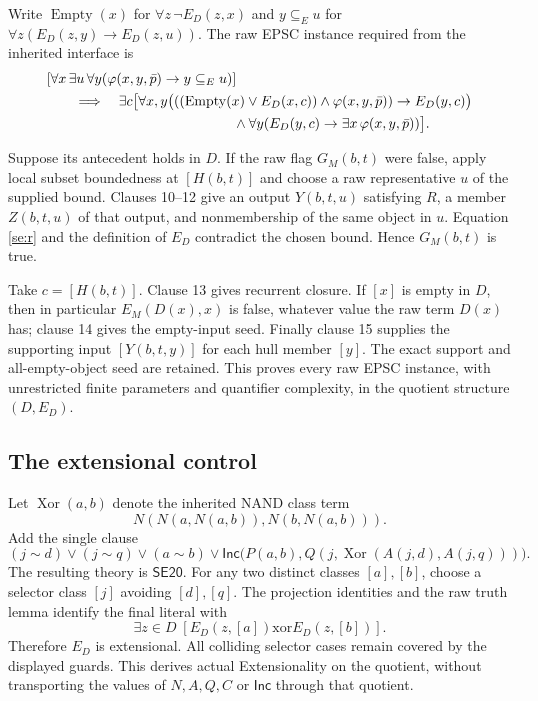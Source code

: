 Write $\operatorname{Empty}(x)$ for $\forall z\,\neg E_D(z,x)$
and $y\subseteq_E u$ for $\forall z(E_D(z,y)\to E_D(z,u))$.
The raw EPSC instance required from the inherited interface is
\begin{align*}
 &[\forall x\,\exists u\,\forall y
       (\varphi(x,y,\bar p)\to y\subseteq_E u)]\\
 &\qquad\Longrightarrow\quad
 \exists c\bigl[
 \forall x,y\bigl(((\operatorname{Empty}(x)\lor E_D(x,c))
     \land\varphi(x,y,\bar p))\to E_D(y,c)\bigr)\\
 &\hspace{47mm}\land\forall y(E_D(y,c)\to\exists x\,
                  \varphi(x,y,\bar p))\bigr].
\end{align*}

Suppose its antecedent holds in $D$. If the raw flag $G_M(b,t)$ were
false, apply local subset boundedness at $[H(b,t)]$ and choose a raw
representative $u$ of the supplied bound. Clauses 10--12 give an output
$Y(b,t,u)$ satisfying $R$, a member $Z(b,t,u)$ of that output, and
nonmembership of the same object in $u$. Equation \eqref{se:r} and
the definition of $E_D$ contradict the chosen bound. Hence $G_M(b,t)$
is true.

Take $c=[H(b,t)]$. Clause 13 gives recurrent closure. If $[x]$ is
empty in $D$, then in particular $E_M(D(x),x)$ is false, whatever value
the raw term $D(x)$ has; clause 14 gives the empty-input seed. Finally
clause 15 supplies the supporting input $[Y(b,t,y)]$ for each hull
member $[y]$. The exact support and all-empty-object seed are retained.
This proves every raw EPSC instance, with unrestricted finite parameters
and quantifier complexity, in the quotient structure $(D,E_D)$.

\subsection{The extensional control}

Let $\operatorname{Xor}(a,b)$ denote the inherited NAND class term
\[
 N(N(a,N(a,b)),N(b,N(a,b))).
\]
Add the single clause
\[
 (j\sim d)\lor(j\sim q)\lor(a\sim b)\lor
 \mathsf{Inc}\bigl(P(a,b),
 Q(j,\operatorname{Xor}(A(j,d),A(j,q)))\bigr).
\]
The resulting theory is $\mathsf{SE20}$. For any two distinct classes
$[a],[b]$, choose a selector class $[j]$ avoiding $[d],[q]$.
The projection identities and the raw truth lemma identify the final
literal with
\[
 \exists z\in D\;[E_D(z,[a])\mathbin{\mathrm{xor}}E_D(z,[b])].
\]
Therefore $E_D$ is extensional. All colliding selector cases remain
covered by the displayed guards. This derives actual Extensionality
on the quotient, without transporting the values of $N,A,Q,C$
or $\mathsf{Inc}$ through that quotient.

